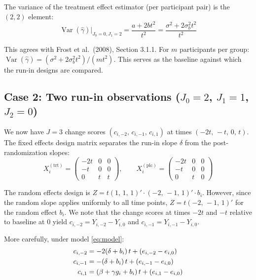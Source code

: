 \documentclass[
  11pt,
]{article}
\begin{document}
The variance of the treatment effect estimator (per participant pair) is
the \((2,2)\) element: \begin{equation}
  \boxed{
    \mathop{\mathrm{Var}}(\hat{\gamma})\big|_{J_0=0,J_1=2}
    = \frac{a + 2bt^2}{t^2}
    = \frac{\sigma^2 + 2\sigma_b^2 t^2}{t^2}
  }
  \label{eq:var_r0k2}
\end{equation}

This agrees with Frost et al.~(2008), Section 3.1.1. For \(m\)
participants per group:
\(\mathop{\mathrm{Var}}(\hat{\gamma}) = (\sigma^2 + 2\sigma_b^2 t^2) /
(m t^2)\). This serves as the baseline against which the run-in designs
are compared.

\subsection{\texorpdfstring{Case 2: Two run-in observations (\(J_0=2\),
\(J_1=1\),
\(J_2=0\))}{Case 2: Two run-in observations (J\_0=2, J\_1=1, J\_2=0)}}\label{case-2-two-run-in-observations-j_02-j_11-j_20}

We now have \(J = 3\) change scores \((c_{i,-2},\, c_{i,-1},\,
c_{i,1})\) at times \((-2t,\, -t,\, 0,\, t)\). The fixed effects design
matrix separates the run-in slope \(\delta\) from the post-randomization
slopes: \[
  X_i^{(\text{trt})} = \begin{pmatrix}
    -2t & 0 & 0 \\ -t & 0 & 0 \\ 0 & t & t
  \end{pmatrix}, \qquad
  X_i^{(\text{plc})} = \begin{pmatrix}
    -2t & 0 & 0 \\ -t & 0 & 0 \\ 0 & t & 0
  \end{pmatrix}
\]

The random effects design is \(Z = t(1,\, 1,\, 1)' \cdot
(-2,\, -1,\, 1)' \cdot b_i\). However, since the random slope applies
uniformly to all time points, \(Z = t(-2,\, -1,
\, 1)'\) for the random effect \(b_i\). We note that the change scores
at times \(-2t\) and \(-t\) relative to baseline at \(0\) yield
\(c_{i,-2} = Y_{i,-2} - Y_{i,0}\) and \(c_{i,-1} = Y_{i,-1} - Y_{i,0}\).

More carefully, under model \eqref{eq:model}: \begin{align}
  c_{i,-2} &= -2(\delta + b_i)\,t + (e_{i,-2} - e_{i,0})
    \notag \\
  c_{i,-1} &= -(\delta + b_i)\,t + (e_{i,-1} - e_{i,0})
    \notag \\
  c_{i,1}  &= (\beta + \gamma g_i + b_i)\,t
    + (e_{i,1} - e_{i,0})
  \label{eq:c_r2}
\end{align}
\end{document}
